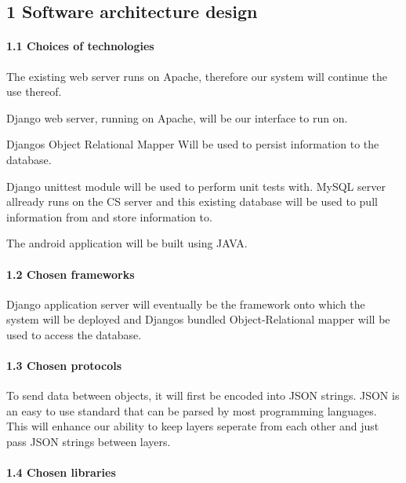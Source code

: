 \documentclass{article}
\begin{document}
\subsection{1  Software architecture design}

 


\paragraph{1.1  Choices of technologies}



The existing web server runs on Apache, therefore our system will continue the use thereof.



Django web server, running on Apache, will be our interface to run on.



Djangos Object Relational Mapper Will be used to persist information to the database.



Django unittest module will be used to perform unit tests with. MySQL server allready runs on the CS server and this existing database will be used to pull information from and store information to.



The android application will be built using JAVA.




\paragraph{1.2  Chosen frameworks}

 Django application server will eventually be the framework onto which the system will be deployed and Djangos bundled Object-Relational mapper will be used to access the database. 


\paragraph{1.3  Chosen protocols}

To send data between objects, it will first be encoded into JSON strings. JSON is an easy to use standard that can be parsed by most programming languages. This will enhance our ability to keep layers seperate from each other and just pass JSON strings between layers. 


\paragraph{1.4  Chosen libraries}
\end{document}
